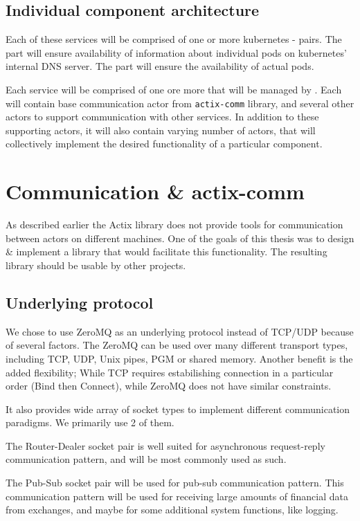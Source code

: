\subsection{Individual component architecture}
Each of these services will be comprised of one or more kubernetes - pairs. The
 part will ensure availability of information about individual pods on kubernetes' internal DNS server.
The  part will ensure the availability of actual pods.

Each service will be comprised of one ore more  that will be managed by . Each 
will contain base communication actor from \verb|actix-comm| library, and several other actors to support communication with other services. In addition to
these supporting actors, it will also contain varying number of actors, that will collectively implement
the desired functionality of a particular component.

\section{Communication \& actix-comm}
\label{section:actix_comm}
As described earlier the Actix library does not provide tools for communication between actors on different machines. One of the
goals of this thesis was to design \& implement a library that would facilitate this functionality. The resulting library
should be usable by other projects.

\subsection{Underlying protocol}
We chose to use ZeroMQ\cite{hintjens2011} as an underlying protocol instead of TCP/UDP because of several factors. The ZeroMQ can be used over
many different transport types, including TCP, UDP, Unix pipes, PGM or shared memory. Another benefit is the added flexibility; While
TCP requires estabilishing connection in a particular order (Bind then Connect), while ZeroMQ does not have similar constraints.

It also provides wide array of socket types to implement different communication paradigms. We primarily use 2 of them.

The Router-Dealer socket pair is well suited for asynchronous request-reply communication pattern, and will be most commonly used as
such.

The Pub-Sub socket pair will be used for pub-sub communication pattern. This communication pattern will be used for receiving
large amounts of financial data from exchanges, and maybe for some additional system functions, like logging.

